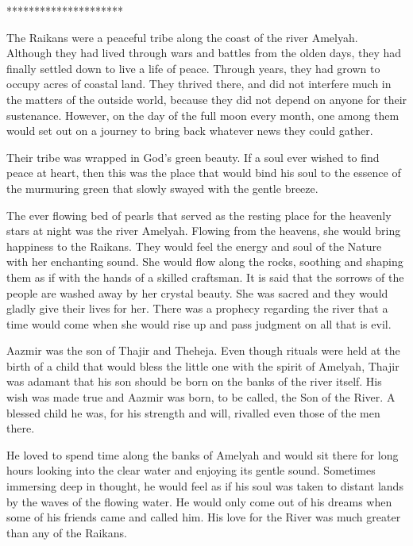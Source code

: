 \documentclass[twoside,11pt,titlepage]{article}
\begin{document}
\bigskip
\begin{center}
*********************
\end{center}

The Raikans were a peaceful tribe along the coast of the river Amelyah. Although they had lived through wars and battles from the olden days, they had finally settled down to live a life of peace. Through years, they had grown to occupy acres of coastal land. They thrived there, and did not interfere much in the matters of the outside world, because they did not depend on anyone for their sustenance. However, on the day of the full moon every month, one among them would set out on a journey to bring back whatever news they could gather.

Their tribe was wrapped in God's green beauty. If a soul ever wished to find peace at heart, then this was the place that would bind his soul to the essence of the murmuring green that slowly swayed with the gentle breeze.

The ever flowing bed of pearls that served as the resting place for the heavenly stars at night was the river Amelyah. Flowing from the heavens, she would bring happiness to the Raikans. They would feel the energy and soul of the Nature with her enchanting sound. She would flow along the rocks, soothing and shaping them as if with the hands of a skilled craftsman. It is said that the sorrows of the people are washed away by her crystal beauty. She was sacred and they would gladly give their lives for her. There was a prophecy regarding the river that a time would come when she would rise up and pass judgment on all that is evil.

Aazmir was the son of Thajir and Theheja. Even though rituals were held at the birth of a child that would bless the little one with the spirit of Amelyah, Thajir was adamant that his son should be born on the banks of the river itself. His wish was made true and Aazmir was born, to be called, the Son of the River. A blessed child he was, for his strength and will, rivalled even those of the men there.

He loved to spend time along the banks of Amelyah and would sit there for long hours looking into the clear water and enjoying its gentle sound. Sometimes immersing deep in thought, he would feel as if his soul was taken to distant lands by the waves of the flowing water. He would only come out of his dreams when some of his friends came and called him. His love for the River was much greater than any of the Raikans.
\end{document}
